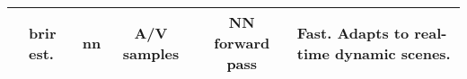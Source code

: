 \begin{landscape}
\begin{table}[tbp]
\begin{tabularx}{\linewidth}{llcccX}
                \cite{chen2023everywhere}                         & \acrshort{brir} est.     & \acrshort{nn}  & A/V samples                   & NN forward pass     & Fast\footnotemark[3]. Adapts to real-time dynamic scenes.\\ \bottomrule
            \end{tabularx}\label{tab:my-table}
            \label{tab:visual-acoustic-mapping}
        \end{table}
\end{landscape}
